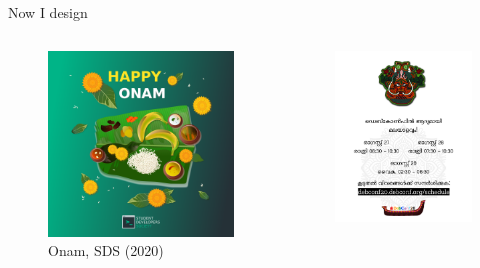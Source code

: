 \documentclass[presentation]{beamer}
\begin{document}
\begin{frame}[label={sec:orged958be}]{Now I design}
\begin{columns}
\begin{column}{0.25\columnwidth}
\begin{figure}[htbp]
\centering
\includegraphics[width=.9\linewidth]{././onam4.png}
\caption{Onam, SDS (2020)}
\end{figure}
\end{column}
\begin{column}{0.25\columnwidth}
\begin{figure}[htbp]
\centering
\includegraphics[width=.9\linewidth]{././theyyam.png}

\end{figure}
\end{column}
\end{columns}
\end{frame}
\end{document}
